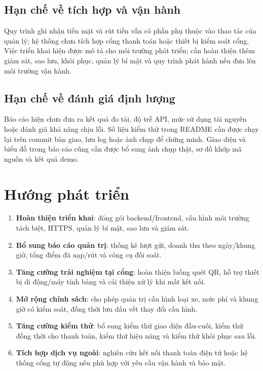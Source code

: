 \subsection{Hạn chế về tích hợp và vận hành}
Quy trình ghi nhận tiền mặt và rút tiền vẫn có phần phụ thuộc vào thao tác của quản lý; hệ thống chưa tích hợp cổng thanh toán hoặc thiết bị kiểm soát cổng. Việc triển khai hiện được mô tả cho môi trường phát triển; cần hoàn thiện thêm giám sát, sao lưu, khôi phục, quản lý bí mật và quy trình phát hành nếu đưa lên môi trường vận hành.

\subsection{Hạn chế về đánh giá định lượng}
Báo cáo hiện chưa đưa ra kết quả đo tải, độ trễ API, mức sử dụng tài nguyên hoặc đánh giá khả năng chịu lỗi. Số liệu kiểm thử trong README cần được chạy lại trên commit bàn giao, lưu log hoặc ảnh chụp để chứng minh. Giao diện và biểu đồ trong báo cáo cũng cần được bổ sung ảnh chụp thật, sơ đồ khớp mã nguồn và kết quả demo.

\section{Hướng phát triển}

\begin{enumerate}[label=\arabic*)]
    \item \textbf{Hoàn thiện triển khai}: đóng gói backend/frontend, cấu hình môi trường tách biệt, HTTPS, quản lý bí mật, sao lưu và giám sát.
    \item \textbf{Bổ sung báo cáo quản trị}: thống kê lượt gửi, doanh thu theo ngày/khung giờ, tổng điểm đã nạp/rút và công cụ đối soát.
    \item \textbf{Tăng cường trải nghiệm tại cổng}: hoàn thiện luồng quét QR, hỗ trợ thiết bị di động/máy tính bảng và cải thiện xử lý khi mất kết nối.
    \item \textbf{Mở rộng chính sách}: cho phép quản trị cấu hình loại xe, mức phí và khung giờ có kiểm soát, đồng thời lưu dấu vết thay đổi cấu hình.
    \item \textbf{Tăng cường kiểm thử}: bổ sung kiểm thử giao diện đầu-cuối, kiểm thử đồng thời cho thanh toán, kiểm thử hiệu năng và kiểm thử khôi phục sau lỗi.
    \item \textbf{Tích hợp dịch vụ ngoài}: nghiên cứu kết nối thanh toán điện tử hoặc hệ thống cổng tự động nếu phù hợp với yêu cầu vận hành và bảo mật.
\end{enumerate}

